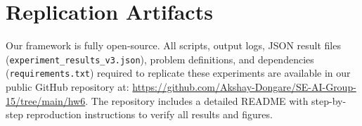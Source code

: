 \documentclass[sigconf,nonacm]{acmart}
\begin{document}
\section{Replication Artifacts}

Our framework is fully open-source. All scripts, output logs, JSON result files (\texttt{experiment\_results\_v3.json}), problem definitions, and dependencies (\texttt{requirements.txt}) required to replicate these experiments are available in our public GitHub repository at: \url{https://github.com/Akshay-Dongare/SE-AI-Group-15/tree/main/hw6}. The repository includes a detailed README with step-by-step reproduction instructions to verify all results and figures.

\nocite{*}


\end{document}
